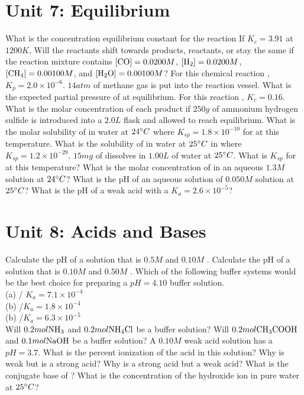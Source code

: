 \documentclass[../main.tex]{subfiles}
\begin{document}
\section{Unit 7: Equilibrium}
\ProblemSet
What is the concentration equilibrium constant for the reaction 
\ProblemSet
If \(K_c = 3.91\) at \(1200K\), Will the reactants shift towards products, reactants, or stay the same if the reaction mixture contains \([\ce{CO}] = 0.0200M\), \([\ce{H2}] = 0.0200M\), \([\ce{CH4}] = 0.00100M\), and \([\ce{H2O}] = 0.00100M\)?
\ProblemSet 
For this chemical reaction , \(K_p = 2.0\times 10^{-6}\). \(14 atm\) of methane gas is put into the reaction vessel. What is the expected partial pressure of  at equilibrium. 
\ProblemSet
For this reaction , \(K_c = 0.16\). What is the molar concentration of each product if \(250g\) of ammonium hydrogen sulfide is introduced into a \(2.0L\) flask and allowed to reach equilibrium. 
\ProblemSet
What is the molar solubility of  in water at \(24\degree C\) where \(K_{sp} = 1.8 \times 10^{-10}\) for  at this temperature.
\ProblemSet 
What is the solubility of  in water at \(25\degree C\) in where \(K_{sp} = 1.2\times 10^{-29}\). 
\ProblemSet
\(15mg\) of  dissolves in \(1.00L\) of water at \(25\degree C\). What is \(K_{sp}\) for  at this temperature?
\ProblemSet 
What is the molar concentration of  in an aqueous \(1.3M\)  solution at \(24\degree C\)?
\ProblemSet
What is the pH of an aqueous solution of \(0.050M\)  solution at \(25\degree C\)?
\ProblemSet
What is the pH of a weak acid with a \(K_a = 2.6\times 10^{-5}\)? 
\section{Unit 8: Acids and Bases}
\ProblemSet
Calculate the pH of  a solution that is \(0.5M\)  and \(0.10M\) .
\ProblemSet
Calculate the pH of a solution that is \(0.10M\)  and \(0.50M\) .
\ProblemSet
Which of the following buffer systems would be the best choice for preparing a \(pH = 4.10\) buffer solution.\\ 
(a) / \hspace{1em} \(K_a = 7.1\times 10^{-4}\) \\
(b) /\hspace{1em}\(K_a = 1.8\times 10^{-4}\)\\
(b) /\hspace{1em}\(K_a = 6.3\times 10^{-5}\)\\
\ProblemSet
Will \(0.2mol\ce{NH3}\) and \(0.2mol\ce{NH4Cl}\) be a buffer solution? 
\ProblemSet
Will \(0.2mol\ce{CH3COOH}\) and \(0.1mol\ce{NaOH}\) be a buffer solution?
\ProblemSet
A \(0.10M\) weak acid solution has a \(pH = 3.7\). What is the percent ionization of the acid in this solution? 
\ProblemSet
Why is  weak but  is  a strong acid?
\ProblemSet
Why is  a strong acid but  a weak acid? 
\ProblemSet
What is the conjugate base of ?
\ProblemSet
What is the concentration of the hydroxide ion in pure water at \(25\degree C\)?
\end{document}

